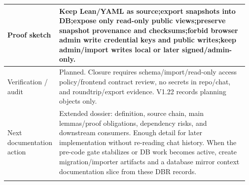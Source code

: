 \begin{longtable}{L{0.16\linewidth} L{0.81\linewidth}}
\hline\addlinespace[0.20em]
Proof sketch & Keep Lean/\allowbreak{}YAML as source;\newline export snapshots into DB;\newline expose only read-only public views;\newline preserve snapshot provenance and checksums;\newline forbid browser admin write credential keys and public writes;\newline keep admin/\allowbreak{}import writes local or later signed/\allowbreak{}admin-only.\\
\hline\addlinespace[0.20em]
Verification /\allowbreak{} audit & Planned. Closure requires schema/\allowbreak{}import/\allowbreak{}read-only access policy/\allowbreak{}frontend contract review, no secrets in repo/\allowbreak{}chat, and roundtrip/\allowbreak{}export evidence. V1.22 records planning objects only.\\
\hline\addlinespace[0.20em]
Next documentation action & Extended dossier: definition, source chain, main lemmas/\allowbreak{}proof obligations, dependency risks, and downstream consumers. Enough detail for later implementation without re-reading chat history. When the pre-code gate stabilizes or DB work becomes active, create migration/\allowbreak{}importer artifacts and a database mirror context documentation slice from these DBR records.\\
\hline\addlinespace[0.20em]
\end{longtable}
